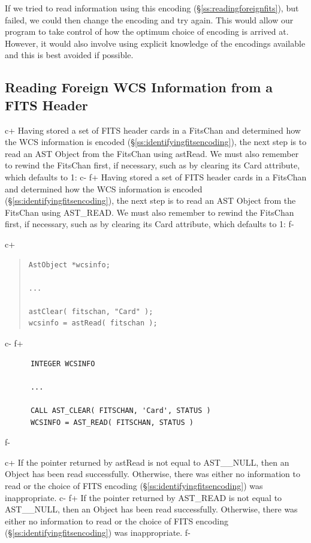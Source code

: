 \documentclass[twoside,11pt]{article}
\newcommand{\secref}[1]{\S\ref{#1}}
\newcommand{\secref}[1]{\ref{#1}}
\begin{document}
If we tried to read information using this encoding
(\secref{ss:readingforeignfits}), but failed, we could then change the
encoding and try again.  This would allow our program to take control
of how the optimum choice of encoding is arrived at. However, it would
also involve using explicit knowledge of the encodings available and
this is best avoided if possible.

\subsection{\label{ss:readingforeignfits}Reading Foreign WCS Information from a FITS Header}

c+
Having stored a set of FITS header cards in a FitsChan and determined
how the WCS information is encoded
(\secref{ss:identifyingfitsencoding}), the next step is to read an AST
Object from the FitsChan using astRead. We must also remember to
rewind the FitsChan first, if necessary, such as by clearing its Card
attribute, which defaults to 1:
c-
f+
Having stored a set of FITS header cards in a FitsChan and determined
how the WCS information is encoded
(\secref{ss:identifyingfitsencoding}), the next step is to read an AST
Object from the FitsChan using AST\_READ. We must also remember to
rewind the FitsChan first, if necessary, such as by clearing its Card
attribute, which defaults to 1:
f-

c+
\begin{quote}
\small
\begin{verbatim}
AstObject *wcsinfo;

...

astClear( fitschan, "Card" );
wcsinfo = astRead( fitschan );
\end{verbatim}
\normalsize
\end{quote}
c-
f+
\small
\begin{verbatim}
      INTEGER WCSINFO

      ...

      CALL AST_CLEAR( FITSCHAN, 'Card', STATUS )
      WCSINFO = AST_READ( FITSCHAN, STATUS )
\end{verbatim}
\normalsize
f-

c+
If the pointer returned by astRead is not equal to AST\_\_NULL, then
an Object has been read successfully. Otherwise, there was either no
information to read or the choice of FITS encoding
(\secref{ss:identifyingfitsencoding}) was inappropriate.
c-
f+
If the pointer returned by AST\_READ is not equal to AST\_\_NULL, then
an Object has been read successfully. Otherwise, there was either no
information to read or the choice of FITS encoding
(\secref{ss:identifyingfitsencoding}) was inappropriate.
f-
\end{document}
